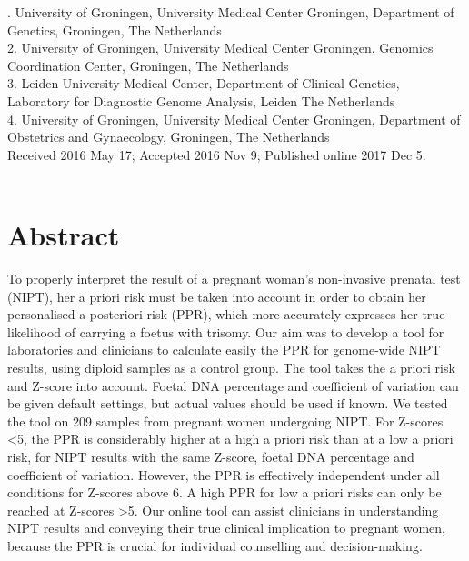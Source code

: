 . University of Groningen, University Medical Center Groningen, Department of Genetics, Groningen, The Netherlands\\
2. University of Groningen, University Medical Center Groningen, Genomics Coordination Center, Groningen, The Netherlands\\
3. Leiden University Medical Center, Department of Clinical Genetics, Laboratory for Diagnostic Genome Analysis, Leiden The Netherlands\\
4. University of Groningen, University Medical Center Groningen, Department of Obstetrics and Gynaecology, Groningen, The Netherlands\\

\noindent
Received 2016 May 17; Accepted 2016 Nov 9; Published online 2017 Dec 5.
\\~\\



\section*{Abstract}\label{abstract}
To properly interpret the result of a pregnant woman’s non-invasive prenatal test (NIPT), her a priori risk must be taken into account in order to obtain her personalised a posteriori risk (PPR), which more accurately expresses her true likelihood of carrying a foetus with trisomy. 
Our aim was to develop a tool for laboratories and clinicians to calculate easily the PPR for genome-wide NIPT results, using diploid samples as a control group. 
The tool takes the a priori risk and Z-score into account. 
Foetal DNA percentage and coefficient of variation can be given default settings, but actual values should be used if known. 
We tested the tool on 209 samples from pregnant women undergoing NIPT. 
For Z-scores \textless 5, the PPR is considerably higher at a high a priori risk than at a low a priori risk, for NIPT results with the same Z-score, foetal DNA percentage and coefficient of variation. However, the PPR is effectively independent under all conditions for Z-scores above 6. 
A high PPR for low a priori risks can only be reached at Z-scores \textgreater 5. 
Our online tool can assist clinicians in understanding NIPT results and conveying their true clinical implication to pregnant women, because the PPR is crucial for individual counselling and decision-making.

